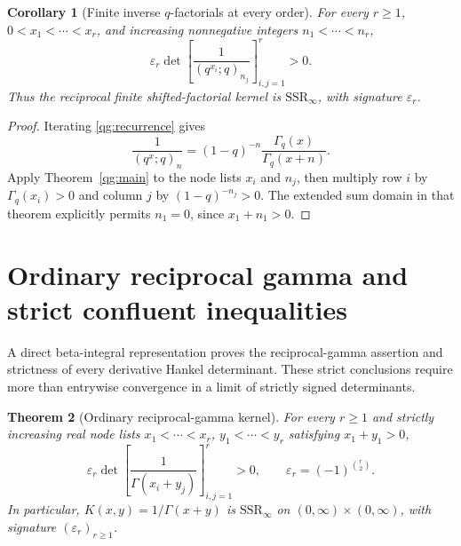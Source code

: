 \documentclass[11pt,a4paper]{article}
\newtheorem{theorem}{Theorem}[section]
\newtheorem{corollary}[theorem]{Corollary}
\theoremstyle{definition}
\theoremstyle{remark}
\newcommand{\ep}{\varepsilon}
\newcommand{\SSR}{\mathrm{SSR}}
\begin{document}
\begin{corollary}[Finite inverse \(q\)-factorials at every order]
\label{qg:inverse-factorials}
For every \(r\ge1\), \(0<x_1<\cdots<x_r\), and increasing
nonnegative integers \(n_1<\cdots<n_r\),
\begin{equation}\label{qg:inverse-factorial-sign}
 \ep_r\det\left[\frac{1}{(q^{x_i};q)_{n_j}}\right]_{i,j=1}^r>0.
\end{equation}
Thus the reciprocal finite shifted-factorial kernel is
\(\SSR_\infty\), with signature \(\ep_r\).
\end{corollary}
\begin{proof}
Iterating \eqref{qg:recurrence} gives
\[
 \frac{1}{(q^x;q)_n}
 =(1-q)^{-n}\frac{\Gamma_q(x)}{\Gamma_q(x+n)}.
\]
Apply Theorem~\ref{qg:main} to the node lists \(x_i\) and
\(n_j\), then multiply row \(i\) by \(\Gamma_q(x_i)>0\)
and column \(j\) by \((1-q)^{-n_j}>0\). The extended sum domain
in that theorem explicitly permits \(n_1=0\), since
\(x_1+n_1>0\).
\end{proof}

\section{Ordinary reciprocal gamma and strict confluent inequalities}
\label{cg:section}

A direct beta-integral representation proves the reciprocal-gamma
assertion and strictness of every derivative Hankel determinant. These strict conclusions require more than entrywise
convergence in a limit of strictly signed determinants.

\begin{theorem}[Ordinary reciprocal-gamma kernel]\label{cg:main}
For every \(r\ge1\) and strictly increasing real node lists
\(x_1<\cdots<x_r\), \(y_1<\cdots<y_r\) satisfying \(x_1+y_1>0\),
\begin{equation}\label{cg:main-inequality}
 \ep_r\det\left[\frac{1}{\Gamma(x_i+y_j)}\right]_{i,j=1}^{r}>0,
 \qquad \ep_r=(-1)^{\binom r2}.
\end{equation}
In particular, \(K(x,y)=1/\Gamma(x+y)\) is \(\SSR_\infty\) on
\((0,\infty)\times(0,\infty)\), with signature \((\ep_r)_{r\ge1}\).
\end{theorem}
\end{document}
